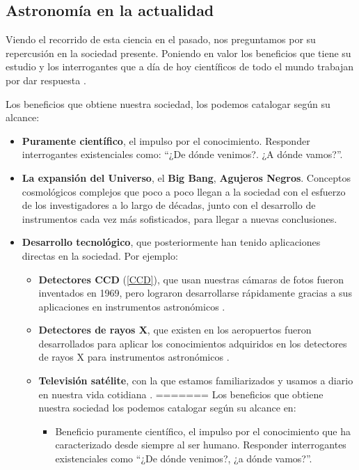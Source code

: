 \subsection{Astronomía en la actualidad}

Viendo el recorrido de esta ciencia en el pasado, nos preguntamos por su repercusión en la sociedad presente. Poniendo en valor los beneficios que tiene su estudio y los interrogantes que a día de hoy científicos de todo el mundo trabajan por dar respuesta \cite{beneficiosastro}.

Los beneficios que obtiene nuestra sociedad, los podemos catalogar según su alcance:

\begin{itemize}
	\item \textbf{Puramente científico}, el impulso por el conocimiento. Responder interrogantes existenciales como: ``¿De dónde venimos?. ¿A dónde vamos?”.


	\item \textbf{La expansión del Universo}, el \textbf{Big Bang}, \textbf{Agujeros Negros}. Conceptos cosmológicos complejos que poco a poco llegan a la sociedad con el esfuerzo de los investigadores a lo largo de décadas, junto con el desarrollo de instrumentos cada vez más sofisticados, para llegar a nuevas conclusiones. 

	\item \textbf{Desarrollo tecnológico}, que posteriormente han tenido aplicaciones directas en la sociedad. Por ejemplo:   \cite{beneficiosastro2}
	
	
	\begin{itemize}
		\item \textbf{Detectores CCD} (\ref{CCD}), que usan nuestras cámaras de fotos fueron inventados en 1969, pero lograron desarrollarse rápidamente gracias a sus aplicaciones en instrumentos astronómicos \cite{ccd}.
		
		\item \textbf{Detectores de rayos X}, que existen en los aeropuertos fueron desarrollados para aplicar los  conocimientos  adquiridos en los detectores de rayos X para instrumentos astronómicos \cite{detectores_rayos_x}.
		
		\item \textbf{Televisión satélite}, con la que estamos familiarizados y usamos a diario en nuestra vida cotidiana \cite{tv_satelite}. 
=======
\bigskip
Los beneficios que obtiene nuestra sociedad los podemos catalogar según su alcance en:
\begin{itemize}
	\item Beneficio puramente científico, el impulso por el conocimiento que ha caracterizado desde siempre al ser humano. Responder interrogantes existenciales como “¿De dónde venimos?, ¿a dónde vamos?”.



\end{itemize}
\end{itemize}
\end{itemize}
